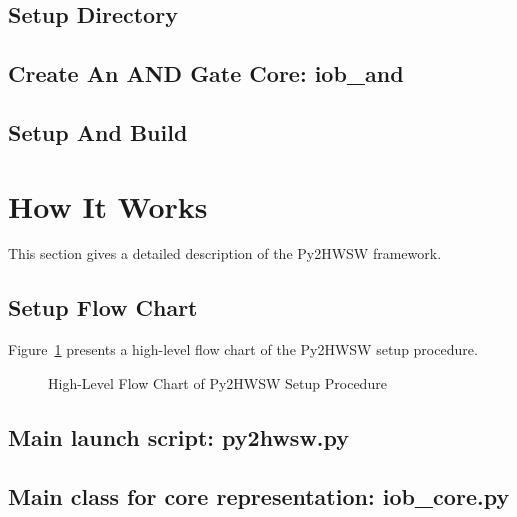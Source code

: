 \documentclass{ug}
\begin{document}
\subsection{Setup Directory}
\label{sec:setup_dir}


\subsection{Create An AND Gate Core: iob\_and}
\label{sec:iob_and}


\subsection{Setup And Build}
\label{sec:setup_build}


%
%
\ifdefined\SECTIONCLEARPAGE
\clearpage
\fi
\section{How It Works}
\label{sec:how_it_works}

This section gives a detailed description of the Py2HWSW framework.

\subsection{Setup Flow Chart}
\label{sec:py2_flow_chart}

Figure~\ref{fig:py2_flow_chart} presents a high-level flow chart of the Py2HWSW setup procedure.

\begin{figure}[H]
  \vspace{-0.7cm}
  \caption{High-Level Flow Chart of Py2HWSW Setup Procedure}
  \label{fig:py2_flow_chart}
\end{figure}

\subsection{Main launch script: py2hwsw.py}
\label{sec:launch_script}


\subsection{Main class for core representation: iob\_core.py}
\label{sec:iob_core}

\end{document}
